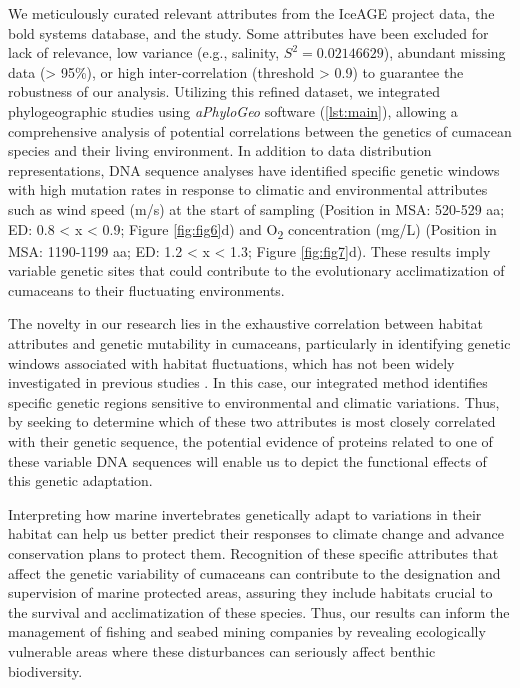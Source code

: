 We meticulously curated relevant attributes from the IceAGE project data, the bold systems database, and the \citep{uhlir_adding_2021} study. Some attributes have been excluded for lack of relevance, low variance (e.g., salinity, $S^2 = 0.02146629$), abundant missing data (> 95\%), or high inter-correlation (threshold > 0.9) to guarantee the robustness of our analysis. Utilizing this refined dataset, we integrated phylogeographic studies using \textit{aPhyloGeo} software (\autoref{lst:main}), allowing a comprehensive analysis of potential correlations between the genetics of cumacean species and their living environment. In addition to data distribution representations, DNA sequence analyses have identified specific genetic windows with high mutation rates in response to climatic and environmental attributes such as wind speed (m/s) at the start of sampling (Position in MSA: 520-529 aa; ED: 0.8 < x < 0.9; Figure \ref{fig:fig6}d) and O\textsubscript{2} concentration (mg/L) (Position in MSA: 1190-1199 aa; ED: 1.2 < x < 1.3; Figure \ref{fig:fig7}d). These results imply variable genetic sites that could contribute to the evolutionary acclimatization of cumaceans to their fluctuating environments.

The novelty in our research lies in the exhaustive correlation between habitat attributes and genetic mutability in cumaceans, particularly in identifying genetic windows associated with habitat fluctuations, which has not been widely investigated in previous studies \citep{manel2003landscape, vrijenhoek2009cryptic}. In this case, our integrated method identifies specific genetic regions sensitive to environmental and climatic variations. Thus, by seeking to determine which of these two attributes is most closely correlated with their genetic sequence, the potential evidence of proteins related to one of these variable DNA sequences will enable us to depict the functional effects of this genetic adaptation.

Interpreting how marine invertebrates genetically adapt to variations in their habitat can help us better predict their responses to climate change and advance conservation plans to protect them. Recognition of these specific attributes that affect the genetic variability of cumaceans can contribute to the designation and supervision of marine protected areas, assuring they include habitats crucial to the survival and acclimatization of these species. Thus, our results can inform the management of fishing and seabed mining companies by revealing ecologically vulnerable areas where these disturbances can seriously affect benthic biodiversity.

